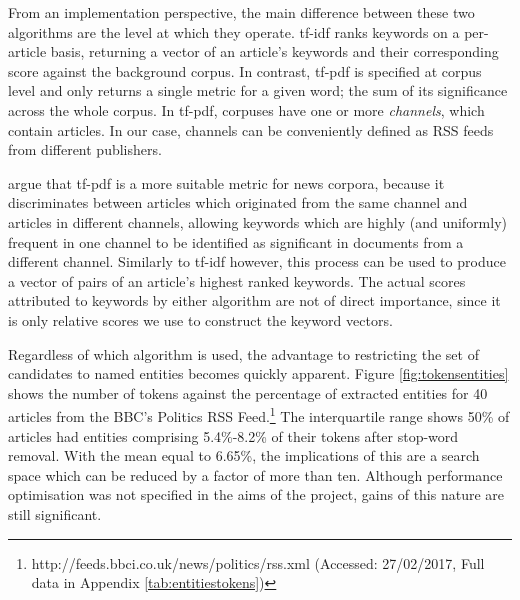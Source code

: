 From an implementation perspective, the main difference between these two algorithms are the level at which they operate. tf-idf ranks keywords on a per-article basis, returning a vector of an article's keywords and their corresponding score against the background corpus. In contrast, tf-pdf is specified at corpus level and only returns a single metric for a given word; the sum of its significance across the whole corpus. In tf-pdf, corpuses have one or more \textit{channels}, which contain articles. In our case, channels can be conveniently defined as RSS feeds from different publishers. 

\citeauthor{TopicExtractionfromnewsArchiveUsingTFPDFAlgorithm} argue that tf-pdf is a more suitable metric for news corpora, because it discriminates between articles which originated from the same channel and articles in different channels, allowing keywords which are highly (and uniformly) frequent in one channel to be identified as significant in documents from a different channel. Similarly to tf-idf however, this process can be used to produce a vector of pairs of an article's highest ranked keywords. The actual scores attributed to keywords by either algorithm are not of direct importance, since it is only relative scores we use to construct the keyword vectors.

%

Regardless of which algorithm is used, the advantage to restricting the set of candidates to named entities becomes quickly apparent. Figure \ref{fig:tokensentities} shows the number of tokens against the percentage of extracted entities for 40 articles from the BBC's Politics RSS Feed.\footnote{http://feeds.bbci.co.uk/news/politics/rss.xml (Accessed: 27/02/2017, Full data in Appendix \ref{tab:entitiestokens})} The interquartile range shows 50\% of articles had entities comprising 5.4\%-8.2\% of their tokens after stop-word removal. With the mean equal to 6.65\%, the implications of this are a search space which can be reduced by a factor of more than ten. Although performance optimisation was not specified in the aims of the project, gains of this nature are still significant.

